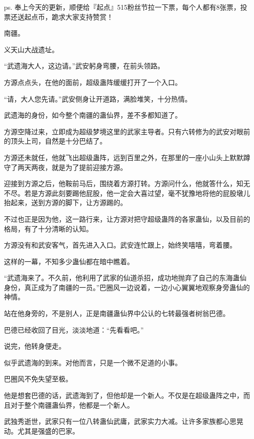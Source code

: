 
\begin{this_body}



ps. 奉上今天的更新，顺便给『起点』515粉丝节拉一下票，每个人都有8张票，投票还送起点币，跪求大家支持赞赏！

南疆。

义天山大战遗址。

“武遗海大人，这边请。”武安躬身弯腰，在前头领路。

方源点点头，在他的面前，超级蛊阵缓缓打开了一个入口。

“请，大人您先请。”武安侧身让开道路，满脸堆笑，十分热情。

武遗海的身份，如今整个南疆的蛊仙界，差不多都知道了。

方源空降过来，立即成为超级梦境这里的武家主导者。只有六转修为的武安对眼前的顶头上司，自然是十分巴结了。

方源还未就任，他就飞出超级蛊阵，远到百里之外，在那里的一座小山头上默默蹲守了两天两夜，就是为了提前迎接方源。

迎接到方源之后，他鞍前马后，围绕着方源打转。方源问什么，他就答什么，知无不尽。若是方源此刻要踢他屁股，他一定会大喜过望，毫不犹豫地将他的屁股墩儿抬起来，送到方源的脚下，让方源踢的。

不过也正是因为他，这一路行来，让方源对把守超级蛊阵的各家蛊仙，以及目前的格局，有了十分清晰的认知。

方源没有和武安客气，首先进入入口。武安连忙跟上，始终笑嘻嘻，弯着腰。

这样的一幕，不知多少蛊仙都在暗中瞧着。

“武遗海来了。不久前，他利用了武家的仙道杀招，成功地抛弃了自己的东海蛊仙身份，真正成为了南疆的一员。”巴圈风一边说着，一边小心翼翼地观察身旁蛊仙的神情。

站在他身旁的，不是别人，正是南疆蛊仙界中公认的七转最强者树翁巴德。

巴德已经收回了目光，淡淡地道：“先看看吧。”

说完，他转身便走。

似乎武遗海的到来。对他而言，只是一个微不足道的小事。

巴圈风不免失望至极。

他是想套巴德的话，武遗海到了，但他却是一个新人。不仅是在超级蛊阵之中，而且对于整个南疆蛊仙界，他都是一个新人。

武独秀逝世，武家只有一位八转蛊仙武庸，武家实力大减。让许多家族都心思晃动。尤其是强盛的巴家。


\end{this_body}
